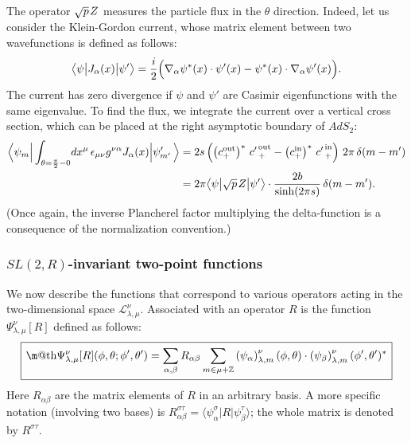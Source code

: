 \documentclass[11pt]{article}
\makeatletter
\newcommand*{\wideboxed}[1]{\setlength{\fboxsep}{1ex}%
  \fbox{\m@th$\displaystyle#1$}}
\newcommand{\lt}{\left}
\newcommand{\rt}{\right}
\newcommand{\blangle}{\bigl\langle}
\newcommand{\brangle}{\bigr\rangle}
\newcommand*{\bra}[1]{\langle{#1}|}
\newcommand*{\ket}[1]{|{#1}\rangle}
\newcommand*{\bbra}[1]{\blangle{#1}\big|}
\newcommand*{\bket}[1]{\big|{#1}\brangle}
\newcommand{\calL}{\mathcal{L}}
\newcommand{\ZZ}{\mathbb{Z}}
\newcommand{\RR}{\mathbb{R}}
\DeclareMathOperator{\SL}{SL}
\DeclareMathOperator{\AdS}{AdS}
\newcommand{\IN}{\text{in}}
\newcommand{\OUT}{\text{out}}
\newcommand{\al}{\alpha}
\def\widetilde#1{#1}%
\def\AdS{AdS}
\def\SL{SL}
\def\RR{R}
\makeatother
\begin{document}
The operator $\sqrt{p}\kern1pt Z$ measures the particle flux in the $\theta$ direction. Indeed, let us consider the Klein-Gordon current, whose matrix element between two wavefunctions is defined as follows:
\begin{equation}\label{J_def}
\bbra{\psi}J_{\alpha}(x)\bket{\psi'}
=\frac{i}{2}\Bigl(\nabla_{\alpha}\psi^{*}(x)\cdot\psi'(x)
-\psi^{*}(x)\cdot\nabla_{\alpha}\psi'(x)\Bigr).
\end{equation}
The current has zero divergence if $\psi$ and $\psi'$ are Casimir eigenfunctions with the same eigenvalue. To find the flux, we integrate the current over a vertical cross section, which can be placed at the right asymptotic boundary of $\widetilde{\AdS}_2$:
\begin{equation} \label{fluxop}
\begin{aligned}
\Bigl\langle\psi_m\Big|
\int_{\theta=\frac{\pi}{2}-0}\! dx^{\mu}\,
\epsilon_{\mu\nu}g^{\nu\al}J_{\al}(x)
\Big|\psi'_{m'}\,\Bigr\rangle
&=2s\lt( \lt( c_{+}^{\OUT} \rt)^{*}\,{c'\kern1pt}_{+}^{\OUT}
-\lt( c_{+}^{\IN} \rt)^{*}\,{c'\kern1pt}_{+}^{\IN} \rt)\,2\pi\,\delta(m-m')\\
&=2\pi\bbra{\psi}\sqrt{p}\kern1pt Z\bket{\psi'}\cdot
\frac{2b}{\sinh(2\pi s)}\,\delta(m-m').
\end{aligned}
\end{equation}
(Once again, the inverse Plancherel factor multiplying the delta-function is a consequence of the normalization convention.)

\subsubsection{$\widetilde{\SL}(2,\RR)$-invariant two-point functions} \label{app:twopt}

We now describe the functions that correspond to various operators acting in the two-dimensional space $\calL^{\nu}_{\lambda,\mu}$. Associated with an operator $R$ is the function $\Psi^{\nu}_{\lambda,\mu}[R]$ defined as follows:
\begin{equation}\label{tp_def}
\wideboxed{
\Psi^{\nu}_{\lambda,\mu}[R](\phi,\theta;\phi',\theta')
=\sum_{\alpha,\beta} R_{\alpha\beta} \sum_{m\in\mu+\ZZ}
\lt( \psi_{\alpha} \rt)^{\nu}_{\lambda,m}(\phi,\theta)\cdot
\lt( \psi_{\beta} \rt)^{\nu}_{\lambda,m}(\phi',\theta')^*
}
\end{equation}
Here $R_{\alpha\beta}$ are the matrix elements of $R$ in an arbitrary basis. A more specific notation (involving two bases) is $R^{\sigma\tau}_{\alpha\beta} =\bra{\psi^{\sigma}_{\alpha}}R \ket{\psi^{\tau}_{\beta}}$; the whole matrix is denoted by $R^{\sigma\tau}$.
\end{document}
